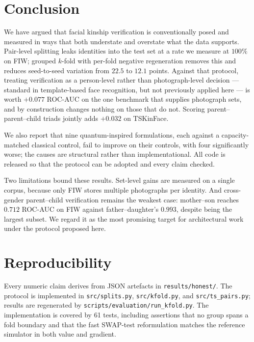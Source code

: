 \documentclass[journal,12pt]{IEEEtran}
\begin{document}
\section{Conclusion}

We have argued that facial kinship verification is conventionally posed and
measured in ways that both understate and overstate what the data supports.
Pair-level splitting leaks identities into the test set at a rate we measure at
$100\%$ on FIW; grouped $k$-fold with per-fold negative regeneration removes
this and reduces seed-to-seed variation from $22.5$ to $12.1$ points. Against
that protocol, treating verification as a person-level rather than
photograph-level decision --- standard in template-based face recognition, but
not previously applied here --- is worth $+0.077$ ROC-AUC on the one benchmark
that supplies photograph sets, and by construction changes nothing on those
that do not. Scoring parent--parent--child triads jointly adds $+0.032$ on
TSKinFace.

We also report that nine quantum-inspired formulations, each against a
capacity-matched classical control, fail to improve on their controls, with
four significantly worse; the causes are structural rather than
implementational. All code is released so that the protocol can be adopted and
every claim checked.

Two limitations bound these results. Set-level gains are measured on a single
corpus, because only FIW stores multiple photographs per identity. And
cross-gender parent--child verification remains the weakest case: mother--son
reaches $0.712$ ROC-AUC on FIW against father--daughter's $0.993$, despite
being the largest subset. We regard it as the most promising target for
architectural work under the protocol proposed here.

\section*{Reproducibility}

Every numeric claim derives from JSON artefacts in \texttt{results/honest/}.
The protocol is implemented in \texttt{src/splits.py}, \texttt{src/kfold.py},
and \texttt{src/ts\_pairs.py}; results are regenerated by
\texttt{scripts/evaluation/run\_kfold.py}. The implementation is covered by 61
tests, including assertions that no group spans a fold boundary and that the
fast SWAP-test reformulation matches the reference simulator in both value and
gradient.
\end{document}
